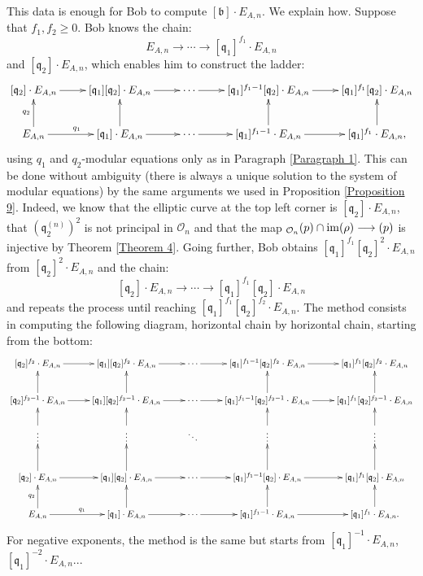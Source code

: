 \documentclass[a4paper,10pt,notitlepage]{report}
\theoremstyle{definition}
\theoremstyle{plain}
\theoremstyle{definition}
\newcommand{\mO}{\mathcal{O}}
\DeclareMathOperator{\im}{im}
\renewcommand{\(}{\left(}
\renewcommand{\)}{\right)}
\newcommand{\mf}[1]{\mathfrak{#1}}
\newcommand{\mfq}{\mathfrak{q}}
\let\SS\relax
\DeclareMathOperator{\SS}{SS}
\begin{document}
This data is enough for Bob to compute $[\mf{b}]\cdot E_{A,n}$. We explain how. Suppose that $f_1, f_2\geq 0$. Bob knows the chain:
\[E_{A,n}\longrightarrow \cdots \longrightarrow [\mf{q}_1]^{f_1}\cdot E_{A,n}\]
and $[\mf{q}_2]\cdot E_{A,n}$, which enables him to construct the ladder:
\[\xymatrix{
[\mf{q}_2]\cdot E_{A,n}  \ar[r] & [\mf{q}_1][\mf{q}_2]\cdot E_{A,n} \ar[r] & \cdots \ar[r] & [\mf{q}_1]^{f_1-1}[\mf{q}_2]\cdot E_{A,n} \ar[r] & [\mf{q}_1]^{f_1}[\mf{q}_2]\cdot E_{A,n}\\
E_{A,n} \ar[u]^{q_2} \ar[r]^{q_1} & [\mf{q}_1]\cdot E_{A,n} \ar[u] \ar[r] & \cdots \ar[r] & [\mf{q}_1]^{f_1-1}\cdot E_{A,n} \ar[u] \ar[r] & [\mf{q}_1]^{f_1}\cdot E_{A,n}, \ar[u]
}\]
using $q_1$ and $q_2$-modular equations only as in Paragraph \ref{Paragraph 1}. This can be done without ambiguity (there is always a unique solution to the system of modular equations) by the same arguments we used in Proposition \ref{Proposition 9}. Indeed, we know that the elliptic curve at the top left corner is $[\mfq_2]\cdot E_{A,n}$, that $(\mfq_2^{(n)})^2$ is not principal in $\mO_n$ and that the map $\SS_{\mO_n}(p)\cap\im(\rho)\longrightarrow\SS(p)$ is injective by Theorem \ref{Theorem 4}. Going further, Bob obtains $[\mf{q}_1]^{f_1}[\mf{q}_2]^2\cdot E_{A,n}$ from $[\mf{q}_2]^2\cdot E_{A,n}$ and the chain:
\[[\mf{q}_2]\cdot E_{A,n}\longrightarrow \cdots \longrightarrow [\mf{q}_1]^{f_1}[\mf{q}_2]\cdot E_{A,n}\]
and repeats the process until reaching $[\mf{q}_1]^{f_1}[\mf{q}_2]^{f_2}\cdot E_{A,n}$. The method consists in computing the following diagram, horizontal chain by horizontal chain, starting from the bottom:
\[\xymatrix{
[\mf{q}_2]^{f_2}\cdot E_{A,n}  \ar[r] & [\mf{q}_1][\mf{q}_2]^{f_2}\cdot E_{A,n} \ar[r] & \cdots \ar[r] & [\mf{q}_1]^{f_1-1}[\mf{q}_2]^{f_2}\cdot E_{A,n} \ar[r] & [\mf{q}_1]^{f_1}[\mf{q}_2]^{f_2}\cdot E_{A,n}\\
[\mf{q}_2]^{f_2-1}\cdot E_{A,n}  \ar[u] \ar[r] & [\mf{q}_1][\mf{q}_2]^{f_2-1}\cdot E_{A,n} \ar[u] \ar[r] & \cdots \ar[r] & [\mf{q}_1]^{f_1-1}[\mf{q}_2]^{f_2-1}\cdot E_{A,n} \ar[u] \ar[r] & [\mf{q}_1]^{f_1}[\mf{q}_2]^{f_2-1}\cdot E_{A,n}\ar[u]\\
\vdots \ar[u] & \vdots \ar[u] & \ddots & \vdots \ar[u] & \vdots \ar[u]\\
[\mf{q}_2]\cdot E_{A,n}  \ar[u] \ar[r] & [\mf{q}_1][\mf{q}_2]\cdot E_{A,n} \ar[u]\ar[r] & \cdots \ar[r] & [\mf{q}_1]^{f_1-1}[\mf{q}_2]\cdot E_{A,n} \ar[u]\ar[r] & [\mf{q}_1]^{f_1}[\mf{q}_2]\cdot E_{A,n} \ar[u] \\
E_{A,n} \ar[u]^{q_2} \ar[r]^{q_1} & [\mf{q}_1]\cdot E_{A,n} \ar[u] \ar[r] & \cdots \ar[r] & [\mf{q}_1]^{f_1-1}\cdot E_{A,n} \ar[u] \ar[r] & [\mf{q}_1]^{f_1}\cdot E_{A,n}. \ar[u]
}\]
For negative exponents, the method is the same but starts from $[\mf{q}_1]^{-1}\cdot E_{A,n}$, $[\mf{q}_1]^{-2}\cdot E_{A,n}$...  
\end{document}
